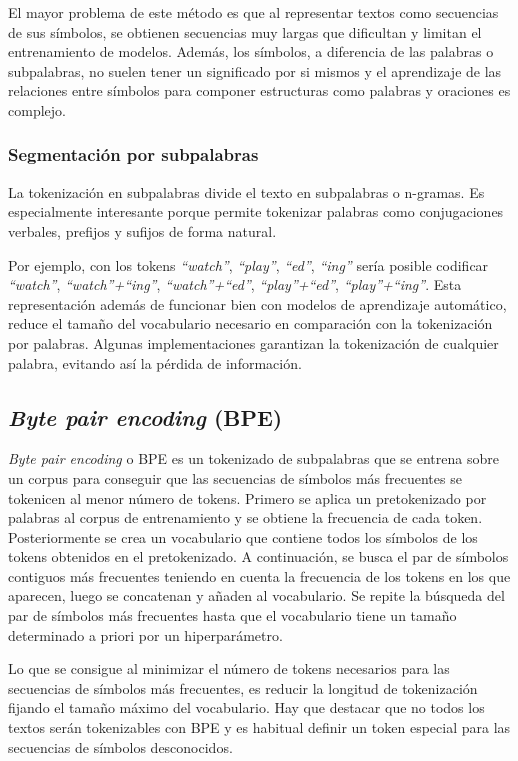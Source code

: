 El mayor problema de este método es que al representar textos como secuencias de sus símbolos, se obtienen secuencias muy largas que dificultan y limitan el entrenamiento de modelos. Además, los símbolos, a diferencia de las palabras o subpalabras, no suelen tener un significado por si mismos y el aprendizaje de las relaciones entre símbolos para componer estructuras como palabras y oraciones es complejo.

\subsubsection{Segmentación por subpalabras}
La tokenización en subpalabras divide el texto en subpalabras o n-gramas. Es especialmente interesante porque permite tokenizar palabras como conjugaciones verbales, prefijos y sufijos de forma natural.

Por ejemplo, con los tokens \textit{``watch''}, \textit{``play''}, \textit{``ed''}, \textit{``ing''} sería posible codificar \textit{``watch''}, \textit{``watch''+``ing''}, \textit{``watch''+``ed''}, \textit{``play''+``ed''}, \textit{``play''+``ing''}. Esta representación además de funcionar bien con modelos de aprendizaje automático, reduce el tamaño del vocabulario necesario en comparación con la tokenización por palabras. Algunas implementaciones garantizan la tokenización de cualquier palabra, evitando así la pérdida de información.

\subsection{\textit{Byte pair encoding} (BPE)}\label{BPE}
\textit{Byte pair encoding} o BPE \cite{Sennrich2015Aug} es un tokenizado de subpalabras que se entrena sobre un corpus para conseguir que las secuencias de símbolos más frecuentes se tokenicen al menor número de tokens. Primero se aplica un pretokenizado por palabras al corpus de entrenamiento y se obtiene la frecuencia de cada token. Posteriormente se crea un vocabulario que contiene todos los símbolos de los tokens obtenidos en el pretokenizado. A continuación, se busca el par de símbolos contiguos más frecuentes teniendo en cuenta la frecuencia de los tokens en los que aparecen, luego se concatenan y añaden al vocabulario. Se repite la búsqueda del par de símbolos más frecuentes hasta que el vocabulario tiene un tamaño determinado a priori por un hiperparámetro.

Lo que se consigue al minimizar el número de tokens necesarios para las secuencias de símbolos más frecuentes, es reducir la longitud de tokenización fijando el tamaño máximo del vocabulario. Hay que destacar que no todos los textos serán tokenizables con BPE y es habitual definir un token especial para las secuencias de símbolos desconocidos.

